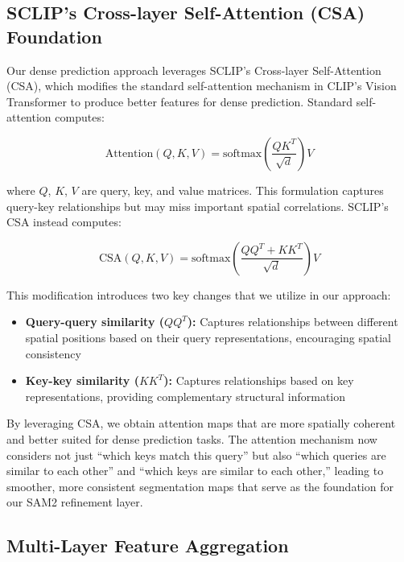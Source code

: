 \subsection{SCLIP's Cross-layer Self-Attention (CSA) Foundation}

Our dense prediction approach leverages SCLIP's Cross-layer Self-Attention (CSA), which modifies the standard self-attention mechanism in CLIP's Vision Transformer to produce better features for dense prediction. Standard self-attention computes:

\begin{equation}
\text{Attention}(Q, K, V) = \text{softmax}\left(\frac{QK^T}{\sqrt{d}}\right)V
\end{equation}

where $Q$, $K$, $V$ are query, key, and value matrices. This formulation captures query-key relationships but may miss important spatial correlations. SCLIP's CSA instead computes:

\begin{equation}
\text{CSA}(Q, K, V) = \text{softmax}\left(\frac{QQ^T + KK^T}{\sqrt{d}}\right)V
\end{equation}

This modification introduces two key changes that we utilize in our approach:

\begin{itemize}
    \item \textbf{Query-query similarity ($QQ^T$):} Captures relationships between different spatial positions based on their query representations, encouraging spatial consistency
    \item \textbf{Key-key similarity ($KK^T$):} Captures relationships based on key representations, providing complementary structural information
\end{itemize}

By leveraging CSA, we obtain attention maps that are more spatially coherent and better suited for dense prediction tasks. The attention mechanism now considers not just ``which keys match this query'' but also ``which queries are similar to each other'' and ``which keys are similar to each other,'' leading to smoother, more consistent segmentation maps that serve as the foundation for our SAM2 refinement layer.

\subsection{Multi-Layer Feature Aggregation}

